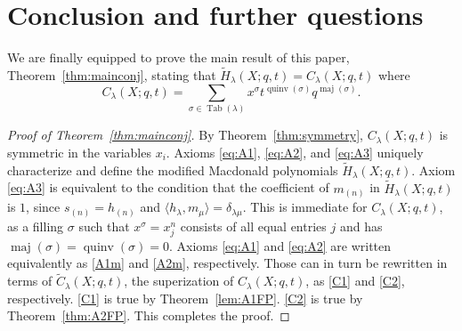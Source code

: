 \documentclass[11pt]{article}
\theoremstyle{definition}
\numberwithin{equation}{section}
\DeclareMathOperator{\PQT}{Tab}
\DeclareMathOperator{\maj}{maj}
\DeclareMathOperator{\quinv}{quinv}
\begin{document}
\section{Conclusion and further questions}\label{sec:conclusion}

We are finally equipped to prove the main result of this paper, Theorem~\ref{thm:mainconj}, stating that $\widetilde{H}_{\lambda}(X;q,t) = C_{\lambda}(X;q,t)$ where 
\[
C_{\lambda}(X;q,t) = \sum_{\sigma\in\PQT(\lambda)}x^{\sigma}t^{\quinv(\sigma)}q^{\maj(\sigma)}.
\]

\begin{proof}[Proof of Theorem~\ref{thm:mainconj}]
By Theorem~\ref{thm:symmetry}, $C_{\lambda}(X;q,t)$ is symmetric in the variables $x_i$. Axioms \eqref{eq:A1}, \eqref{eq:A2}, and \eqref{eq:A3} uniquely characterize and define the modified Macdonald polynomials $\widetilde{H}_{\lambda}(X;q,t)$. Axiom \eqref{eq:A3} is equivalent to the condition that the coefficient of $m_{(n)}$ in $\widetilde{H}_{\lambda}(X;q,t)$ is $1$, since $s_{(n)}=h_{(n)}$ and $\langle h_{\lambda},m_{\mu}\rangle=\delta_{\lambda\mu}$. This is immediate for $C_{\lambda}(X;q,t)$, as a filling $\sigma$ such that $x^{\sigma}=x_j^n$ consists of all equal entries $j$ and has $\maj(\sigma)=\quinv(\sigma)=0$. Axioms \eqref{eq:A1} and \eqref{eq:A2} are written equivalently as \eqref{A1m} and \eqref{A2m}, respectively. 
Those can in turn be rewritten in terms of $\widetilde{C}_{\lambda}(X;q,t)$, the superization of $C_{\lambda}(X;q,t)$, as \eqref{C1} and \eqref{C2}, respectively. \eqref{C1} is true by Theorem~\ref{lem:A1FP}. \eqref{C2} is true by Theorem~\ref{thm:A2FP}. This completes the proof. 
\end{proof}
\end{document}
